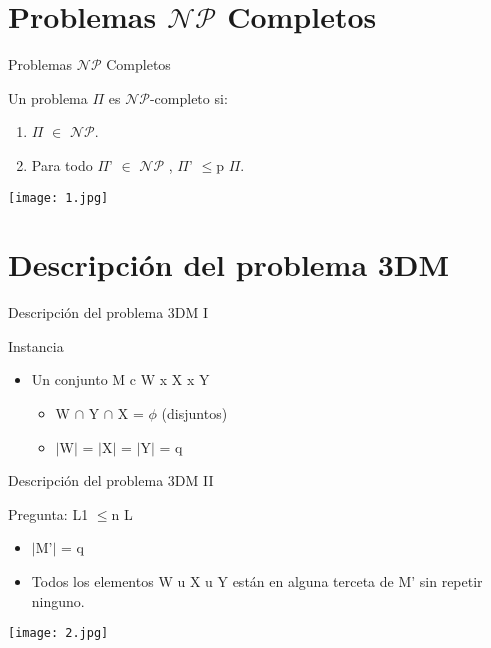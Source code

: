\documentclass[10pt, mathserif, profesionalfont]{beamer}
\begin{document}
\section{Problemas $\mathcal{NP}$ Completos}
\begin{frame}{Problemas $\mathcal{NP}$ Completos}
    
\begin{block}  
Un problema $\Pi$ es $\mathcal{NP}$-completo si:
\begin{enumerate}

	\item $\Pi$ $\in$ $\mathcal{NP}$.
	\item Para todo $\Pi$' $\in$ $\mathcal{NP}$ , $\Pi$' $\leq$p $\Pi$.
	\end{enumerate}
		\texttt{[image: 1.jpg]}

\end{block}


\end{frame}

\section{Descripción del problema 3DM}
\begin{frame}{Descripción del problema 3DM I}
    \begin{block}  
	Instancia
		\begin{itemize}
			\item Un conjunto M c W x X x Y	
			\begin{itemize}
				\item W $\cap$ Y $\cap$ X = $\phi$ (disjuntos)
				\item $\mid$W$\mid$ = $\mid$X$\mid$ = $\mid$Y$\mid$ = q
			\end{itemize}
		\end{itemize}
\end{block}


\end{frame}
\begin{frame}{Descripción del problema 3DM II}		
	 \begin{block}
	 Pregunta: L1 $\leq$n L
		\begin{itemize}
			\item $\mid$M'$\mid$ = q
			\item Todos los elementos W u X u Y están en alguna terceta de M' sin repetir ninguno.
		\end{itemize}
		
			\texttt{[image: 2.jpg]}
\end{block}
\end{frame}
\end{document}

